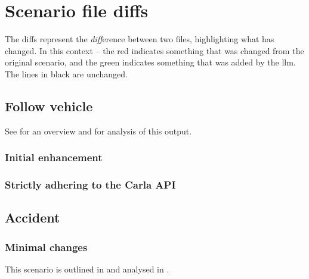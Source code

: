 \chapter{Scenario file diffs}\label{sec:fileDiffs}

The diffs represent the \emph{diff}erence between two files, highlighting what
has changed. In this context -- the red indicates something that was changed
from the original scenario, and the green indicates something that was added by
the \acrshort{llm}. The lines in black are unchanged.

\section{Follow vehicle}

See  for an overview and  for analysis of this output.

\subsection{Initial enhancement}




\subsection{Strictly adhering to the Carla API}



\section{Accident}\label{sec:appendixAccidentDiffs}

\subsection{Minimal changes}

This scenario is outlined in  and analysed in .

